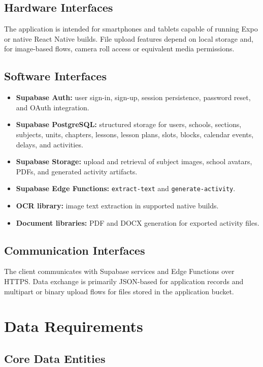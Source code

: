 \documentclass[12pt]{article}
\begin{document}
\subsection{Hardware Interfaces}

The application is intended for smartphones and tablets capable of running Expo
or native React Native builds. File upload features depend on local storage and,
for image-based flows, camera roll access or equivalent media permissions.

\subsection{Software Interfaces}

\begin{itemize}
\item \textbf{Supabase Auth:} user sign-in, sign-up, session persistence,
password reset, and OAuth integration.
\item \textbf{Supabase PostgreSQL:} structured storage for users, schools,
sections, subjects, units, chapters, lessons, lesson plans, slots, blocks,
calendar events, delays, and activities.
\item \textbf{Supabase Storage:} upload and retrieval of subject images, school
avatars, PDFs, and generated activity artifacts.
\item \textbf{Supabase Edge Functions:} \texttt{extract-text} and \texttt{generate-activity}.
\item \textbf{OCR library:} image text extraction in supported native builds.
\item \textbf{Document libraries:} PDF and DOCX generation for exported activity
files.
\end{itemize}

\subsection{Communication Interfaces}

The client communicates with Supabase services and Edge Functions over HTTPS. Data
exchange is primarily JSON-based for application records and multipart or binary
upload flows for files stored in the application bucket.

\section{Data Requirements}

\subsection{Core Data Entities}
\end{document}
